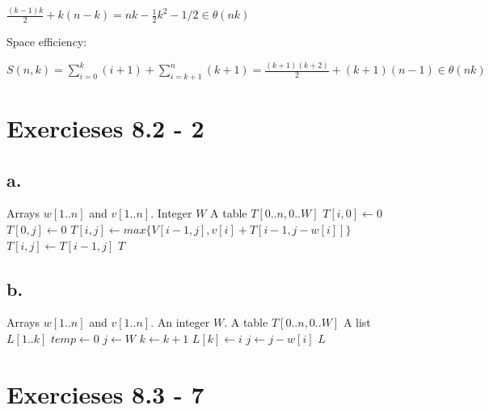 \documentclass{article}
\begin{document}
$\frac{(k-1)k}{2} + k(n-k) = nk - \frac{1}{2}k^2 - 1/2 \in \theta(nk)$

Space efficiency:

$S(n,k) = \sum_{i=0}^k(i+1) + \sum_{i=k+1}^n(k+1) = \frac{(k+1)(k+2)}{2} +(k+1)(n-1) \in \theta(nk)$

\section{Exercieses 8.2 - 2}

\subsection*{a.}

\begin{center}
\begin{algorithmic}
\INPUT
Arrays $w[1..n]$ and $v[1..n]$. Integer $W$
\OUTPUT
A table $T[0..n,0..W]$
\State $T[i,0] \leftarrow 0$
\EndFor
{}
\State $T[0,j] \leftarrow 0$
\EndFor
{}
\State $T[i,j] \leftarrow max\{V[i-1,j], v[i]+T[i-1,j-w[i]]\}$
\Else
\State $T[i,j] \leftarrow T[i-1,j]$
\EndIf
\EndFor
\EndFor
\State \Return $T$
\EndFunction
\end{algorithmic}
\end{center}

\subsection*{b.}

\begin{center}
\begin{algorithmic}
\INPUT
Arrays $w[1..n]$ and $v[1..n]$. An integer $W$. A table $T[0..n,0..W]$
\OUTPUT
A list $L[1..k]$
\State $temp \leftarrow 0$
\State $j \leftarrow W$
\State $k \leftarrow k+1$
\State $L[k] \leftarrow i$
\State $j \leftarrow j - w[i]$
\EndIf
\EndFor
\State \Return $L$
\EndFunction
\end{algorithmic}
\end{center}

\section{Exercieses 8.3 - 7}
\end{document}
